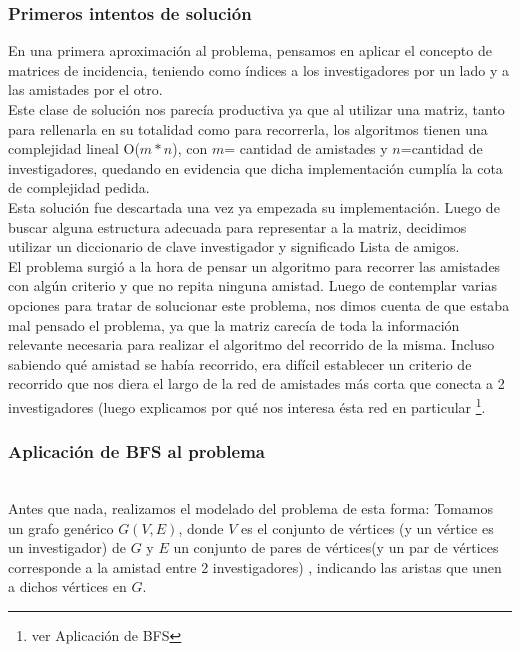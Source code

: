 \subsubsection{Primeros intentos de solución}
\indent En una primera aproximación al problema, pensamos en aplicar el
concepto de matrices de incidencia,
teniendo como índices a los investigadores por un lado y a las amistades por el
otro.\\
\indent Este clase de solución nos parecía productiva ya que al utilizar una
matriz, tanto para rellenarla en su totalidad como para recorrerla, los
algoritmos tienen una complejidad lineal O($m*n$), con $m$= cantidad de
amistades y $n$=cantidad de investigadores, quedando en evidencia que dicha
implementación cumplía la cota de complejidad pedida. \\
\indent Esta solución fue descartada una vez ya empezada su implementación.
Luego de buscar alguna estructura adecuada para representar a la matriz,
decidimos utilizar un diccionario de clave investigador y significado Lista de
amigos.\\
\indent El problema surgió a la hora de pensar un algoritmo para recorrer las
amistades con algún criterio y que no repita ninguna amistad. Luego de
contemplar varias opciones para tratar de solucionar este problema, nos dimos
cuenta de que estaba mal pensado el problema, ya que la matriz carecía de toda
la
información relevante necesaria para realizar el algoritmo del recorrido de la
misma. Incluso sabiendo qué amistad se había recorrido, era difícil establecer
un criterio de recorrido que nos diera el largo de la red de amistades más corta
que conecta a 2 investigadores (luego explicamos por qué nos interesa ésta red
en particular \footnote{ver Aplicación de BFS}.


\subsubsection{Aplicación de BFS al problema}
\indent {}\\

\indent Antes que nada, realizamos el modelado del problema de esta forma:
Tomamos un grafo genérico $G(V,E)$, donde $V$ es el conjunto de vértices (y un
vértice es un 
investigador) de $G$ y $E$ un conjunto de pares de vértices(y un par de vértices
corresponde a la amistad entre
2 investigadores) , indicando las aristas que unen a dichos vértices en $G$.\\

